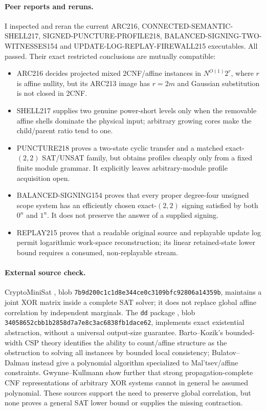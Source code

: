 \documentclass[11pt]{article}
\begin{document}
\paragraph{Peer reports and reruns.}
I inspected and reran the current ARC216, CONNECTED-SEMANTIC-SHELL217, SIGNED-PUNCTURE-PROFILE218, BALANCED-SIGNING-TWO-WITNESSES154 and UPDATE-LOG-REPLAY-FIREWALL215 executables.  All passed.  Their exact restricted conclusions are mutually compatible:
\begin{itemize}
\item ARC216 decides projected mixed 2CNF/affine instances in $N^{O(1)}2^r$, where $r$ is affine nullity, but its ARC213 image has $r=2m$ and Gaussian substitution is not closed in 2CNF.
\item SHELL217 supplies two genuine power-short levels only when the removable affine shells dominate the physical input; arbitrary growing cores make the child/parent ratio tend to one.
\item PUNCTURE218 proves a two-state cyclic transfer and a matched exact-$(2,2)$ SAT/UNSAT family, but obtains profiles cheaply only from a fixed finite module grammar.  It explicitly leaves arbitrary-module profile acquisition open.
\item BALANCED-SIGNING154 proves that every proper degree-four unsigned scope system has an efficiently chosen exact-$(2,2)$ signing satisfied by both $0^n$ and $1^n$.  It does not preserve the answer of a supplied signing.
\item REPLAY215 proves that a readable original source and replayable update log permit logarithmic work-space reconstruction; its linear retained-state lower bound requires a consumed, non-replayable stream.
\end{itemize}

\paragraph{External source check.}
CryptoMiniSat , blob
\texttt{7b9d200c1c1d8e344ce0c3109bfc92806a14359b}, maintains a joint XOR matrix inside a complete SAT solver; it does not replace global affine correlation by independent marginals.  The \texttt{dd} package , blob \texttt{34058652cbb1b2858d7a7e8c3ac6838fb1dace62}, implements exact existential abstraction, without a universal output-size guarantee.  Barto--Kozik's bounded-width CSP theory identifies the ability to count/affine structure as the obstruction to solving all instances by bounded local consistency; Bulatov--Dalmau instead give a polynomial algorithm specialized to Mal'tsev/affine constraints.  Gwynne--Kullmann show further that strong propagation-complete CNF representations of arbitrary XOR systems cannot in general be assumed polynomial.  These sources support the need to preserve global correlation, but none proves a general SAT lower bound or supplies the missing contraction.
\end{document}

